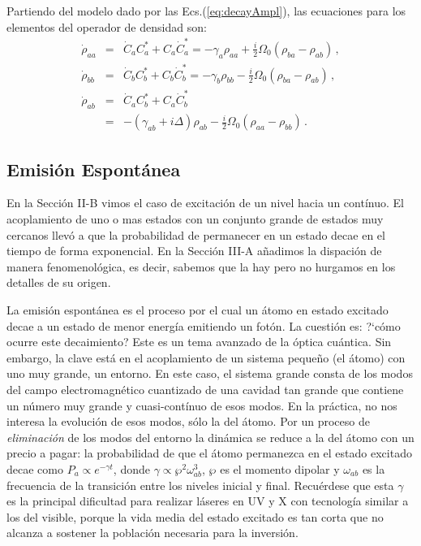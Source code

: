 \documentclass[12pt]{report}
\begin{document}
Partiendo del modelo dado por las Ecs.(\ref{eq:decayAmpl}), las ecuaciones 
para los elementos del operador de densidad son:
%
\begin{eqnarray}
\dot{\rho}_{aa} &=& \dot{C}_a C_a^{\ast} + C_a \dot{C}_a^{\ast}   
    = -\gamma_a \rho_{aa} + \frac{i}{2} \Omega_0 (\rho_{ba} - \rho_{ab}) \,, 
    	\nonumber \\ 
\dot{\rho}_{bb} &=& \dot{C}_b C_b^{\ast} + C_b \dot{C}_b^{\ast}  
  = -\gamma_b \rho_{bb} - \frac{i}{2} \Omega_0 (\rho_{ba} - \rho_{ab}) \,, 
  	\nonumber \\ 
\dot{\rho}_{ab} &=& \dot{C}_a C_b^{\ast} + C_a \dot{C}_b^{\ast}  \nonumber \\ 
  	&=& - (\gamma_{ab} +i\Delta) \rho_{ab} 
  	- \frac{i}{2} \Omega_0 (\rho_{aa} - \rho_{bb})  \,.
\end{eqnarray}

\subsection{Emisi\'on Espont\'anea} 
En la Secci\'on II-B vimos el caso de excitaci\'on de un nivel hacia un cont\'inuo. 
El acoplamiento de uno o mas estados con un conjunto grande de estados muy 
cercanos llev\'o a que la probabilidad de permanecer en un estado decae en el 
tiempo de forma exponencial. En la Secci\'on III-A a\~nadimos la dispaci\'on de 
manera fenomenol\'ogica, es decir, sabemos que la hay pero no hurgamos en 
los detalles de su origen.   

La emisi\'on espont\'anea es el proceso por el cual un \'atomo en estado 
excitado decae a un estado de menor energ\'ia emitiendo un fot\'on. La 
cuesti\'on es: ?`c\'omo ocurre este decaimiento? Este es un tema avanzado 
de la \'optica cu\'antica. Sin embargo, la clave est\'a en el acoplamiento de un 
sistema peque\~no (el \'atomo) con uno muy grande, un entorno. En este 
caso, el sistema grande consta de los modos del campo electromagn\'etico 
cuantizado de una cavidad tan grande que contiene un n\'umero muy grande y 
cuasi-cont\'inuo de esos modos. En la pr\'actica, no nos interesa la evoluci\'on 
de esos modos, s\'olo la del \'atomo. Por un proceso de \textit{eliminaci\'on} de 
los modos del entorno la din\'amica se reduce a la del \'atomo con un precio a 
pagar: la probabilidad de que el \'atomo permanezca en el estado excitado 
decae como $P_a \propto e^{-\gamma t}$, donde 
$\gamma \propto \wp^2 \omega_{ab}^3$, $\wp$ es el momento dipolar y 
$\omega_{ab}$ es la frecuencia de la transici\'on entre los niveles inicial y 
final.  Recu\'erdese que esta $\gamma$ es la principal dificultad para realizar 
l\'aseres en UV y X con tecnolog\'ia similar a los del visible, porque la vida 
media del estado excitado es tan corta que no alcanza a sostener la 
poblaci\'on necesaria para la inversi\'on.   
\end{document}
